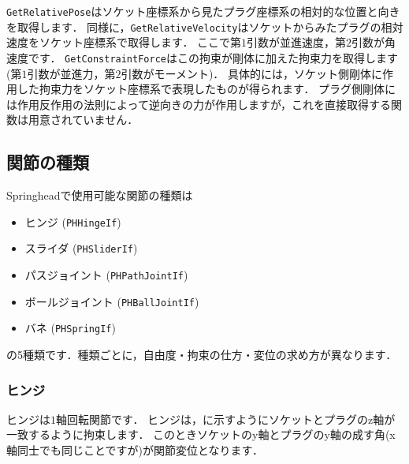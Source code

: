 \texttt{GetRelativePose}\KLUDGE はソケット座標系から見たプラグ座標系の相対的な位置と向きを取得します．
\KLUDGE 同様に，\texttt{GetRelativeVelocity}\KLUDGE はソケットからみたプラグの相対速度をソケット座標系で取得します．
\KLUDGE ここで第$1$\KLUDGE 引数が並進速度，第$2$\KLUDGE 引数が角速度です．
\texttt{GetConstraintForce}\KLUDGE はこの拘束が剛体に加えた拘束力を取得します(\KLUDGE 第$1$\KLUDGE 引数が並進力，第$2$\KLUDGE 引数がモーメント)\KLUDGE ．
\KLUDGE 具体的には，ソケット側剛体に作用した拘束力をソケット座標系で表現したものが得られます．
\KLUDGE プラグ側剛体には作用反作用の法則によって逆向きの力が作用しますが，これを直接取得する関数は用意されていません．





\subsection*{\KLUDGE 関節の種類}

Springhead\KLUDGE で使用可能な関節の種類は

\begin{itemize}
\item \KLUDGE ヒンジ (\texttt{PHHingeIf})
\item \KLUDGE スライダ (\texttt{PHSliderIf})
\item \KLUDGE パスジョイント (\texttt{PHPathJointIf})
\item \KLUDGE ボールジョイント (\texttt{PHBallJointIf})
\item \KLUDGE バネ (\texttt{PHSpringIf})
\end{itemize}

\KLUDGE の5\KLUDGE 種類です．種類ごとに，自由度・拘束の仕方・変位の求め方が異なります．


\subsubsection*{\KLUDGE ヒンジ}

\begin{fig}
\end{fig}

\KLUDGE ヒンジは$1$\KLUDGE 軸回転関節です．
\KLUDGE ヒンジは，\KLUDGE に示すようにソケットとプラグのz\KLUDGE 軸が一致するように拘束します．
\KLUDGE このときソケットのy\KLUDGE 軸とプラグのy\KLUDGE 軸の成す角(x\KLUDGE 軸同士でも同じことですが)\KLUDGE が関節変位となります．

